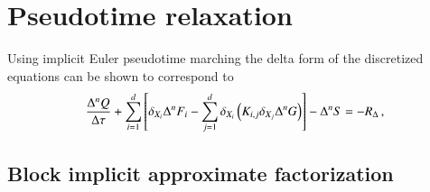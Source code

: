 \section{Pseudotime relaxation}

Using implicit Euler pseudotime marching the delta form of the discretized
equations can be shown to correspond to
%
\begin{equation}
   \displaystyle\frac{\Delta^n Q}{\Delta \tau}
    +\sum_{i=1}^{d}\left[ \delta_{X_i}  {\Delta^n F_i}
            - \sum_{j=1}^{d} \delta_{X_i}
           \left( K_{i,j} \delta_{X_j}
                 {\Delta^n G}\right) \right]
    -\Delta^n S = -R_{\Delta} \, ,
\label{eqn:deltaform}
\end{equation}
%


\subsection{Block implicit approximate factorization}

